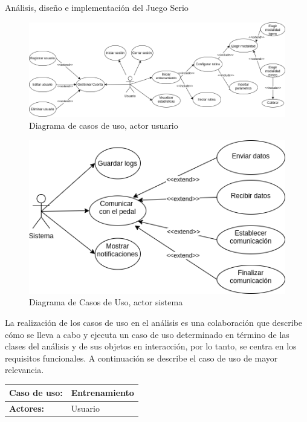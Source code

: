 \begin{thesischapter}{2} {Análisis, diseño e implementación del Juego Serio}
    \vspace*{50pt}
    \begin{figure}[h]
        \centering
        \includegraphics[scale=0.44]{images/diagram-usecase-user.png}
        \caption{Diagrama de casos de uso, actor usuario}
        \label{fig: use-cases-user}
    \end{figure}

    \vspace*{50pt}
    \begin{figure}[h]
        \centering
        \includegraphics[scale=0.44]{images/diagram-usecase-system.png}
        \caption{Diagrama de Casos de Uso, actor sistema}
        \label{fig: use-cases-system}
    \end{figure}

    \vspace*{100pt}
    La realización de los casos de uso en el análisis es una colaboración que describe cómo se lleva a cabo y ejecuta un caso de uso 
    determinado en término de las clases del análisis y de sus objetos en interacción, por lo tanto, se centra en los requisitos funcionales. 
    A continuación se describe el caso de uso de mayor relevancia.
    
    \begin{center}
        \begin{table}
            \begin{tabularx}{\textwidth}{|X|X|}
                \hline
                \textbf{Caso de uso:} & Entrenamiento \\\hline
                \textbf{Actores:}     & Usuario \\\hline
                

\end{tabularx}
\end{table}
\end{center}
\end{thesischapter}
